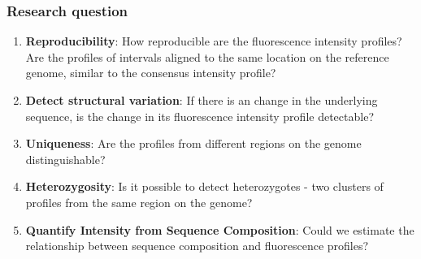 \subsubsection*{Research question}
\begin{enumerate}
\item {\bf{Reproducibility}}: How reproducible are the fluorescence intensity profiles? Are the profiles of intervals aligned to the same location on the reference genome, similar to the consensus intensity profile?
\item {\bf{Detect structural variation}}: If there is an change in the underlying sequence, is the change in its fluorescence intensity profile detectable?
\item {\bf{Uniqueness}}: Are the profiles from different regions on the genome distinguishable? 
\item {\bf{Heterozygosity}}: Is it possible to detect heterozygotes - two clusters of profiles from the same region on the genome?
\item {\bf{Quantify Intensity from Sequence Composition}}: Could we estimate the relationship between sequence composition and fluorescence profiles?
\end{enumerate}

